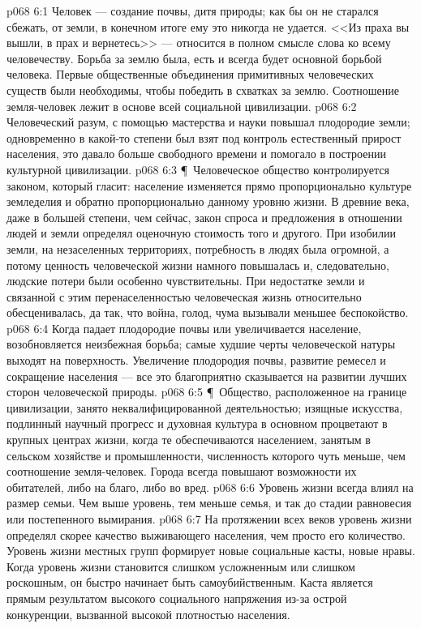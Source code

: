 \vs p068 6:1 Человек --- создание почвы, дитя природы; как бы он не старался сбежать, от земли, в конечном итоге ему это никогда не удается. <<Из праха вы вышли, в прах и вернетесь>> --- относится в полном смысле слова ко всему человечеству. Борьба за землю была, есть и всегда будет основной борьбой человека. Первые общественные объединения примитивных человеческих существ были необходимы, чтобы победить в схватках за землю. Соотношение земля\hyp{}человек лежит в основе всей социальной цивилизации.
\vs p068 6:2 Человеческий разум, с помощью мастерства и науки повышал плодородие земли; одновременно в какой\hyp{}то степени был взят под контроль естественный прирост населения, это давало больше свободного времени и помогало в построении культурной цивилизации.
\vs p068 6:3 \P\ Человеческое общество контролируется законом, который гласит: население изменяется прямо пропорционально культуре земледелия и обратно пропорционально данному уровню жизни. В древние века, даже в большей степени, чем сейчас, закон спроса и предложения в отношении людей и земли определял оценочную стоимость того и другого. При изобилии земли, на незаселенных территориях, потребность в людях была огромной, а потому ценность человеческой жизни намного повышалась и, следовательно, людские потери были особенно чувствительны. При недостатке земли и связанной с этим перенаселенностью человеческая жизнь относительно обесценивалась, да так, что война, голод, чума вызывали меньшее беспокойство.
\vs p068 6:4 Когда падает плодородие почвы или увеличивается население, возобновляется неизбежная борьба; самые худшие черты человеческой натуры выходят на поверхность. Увеличение плодородия почвы, развитие ремесел и сокращение населения --- все это благоприятно сказывается на развитии лучших сторон человеческой природы.
\vs p068 6:5 \P\ Общество, расположенное на границе цивилизации, занято неквалифицированной деятельностью; изящные искусства, подлинный научный прогресс и духовная культура в основном процветают в крупных центрах жизни, когда те обеспечиваются населением, занятым в сельском хозяйстве и промышленности, численность которого чуть меньше, чем соотношение земля\hyp{}человек. Города всегда повышают возможности их обитателей, либо на благо, либо во вред.
\vs p068 6:6 Уровень жизни всегда влиял на размер семьи. Чем выше уровень, тем меньше семья, и так до стадии равновесия или постепенного вымирания.
\vs p068 6:7 На протяжении всех веков уровень жизни определял скорее качество выживающего населения, чем просто его количество. Уровень жизни местных групп формирует новые социальные касты, новые нравы. Когда уровень жизни становится слишком усложненным или слишком роскошным, он быстро начинает быть самоубийственным. Каста является прямым результатом высокого социального напряжения из\hyp{}за острой конкуренции, вызванной высокой плотностью населения.
